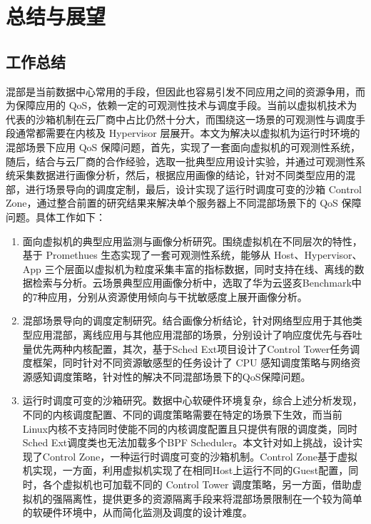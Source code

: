 \chapter{总结与展望}\label{chap:theories_tech}

\section{工作总结}

混部是当前数据中心常用的手段，但因此也容易引发不同应用之间的资源争用，而为保障应用的 QoS，依赖一定的可观测性技术与调度手段。当前以虚拟机技术为代表的沙箱机制在云厂商中占比仍然十分大，而围绕这一场景的可观测性与调度手段通常都需要在内核及 Hypervisor 层展开。本文为解决以虚拟机为运行时环境的混部场景下应用 QoS 保障问题，首先，实现了一套面向虚拟机的可观测性系统，随后，结合与云厂商的合作经验，选取一批典型应用设计实验，并通过可观测性系统采集数据进行画像分析，然后，根据应用画像的结论，针对不同类型应用的混部，进行场景导向的调度定制，最后，设计实现了运行时调度可变的沙箱 Control Zone，通过整合前置的研究结果来解决单个服务器上不同混部场景下的 QoS 保障问题。具体工作如下：

\begin{enumerate}
    \item 面向虚拟机的典型应用监测与画像分析研究。围绕虚拟机在不同层次的特性，基于 Promethues 生态实现了一套可观测性系统，能够从 Host、Hypervisor、App 三个层面以虚拟机为粒度采集丰富的指标数据，同时支持在线、离线的数据检索与分析。云场景典型应用画像分析中，选取了华为云竖亥Benchmark中的7种应用，分别从资源使用倾向与干扰敏感度上展开画像分析。

    \item 混部场景导向的调度定制研究。结合画像分析结论，针对网络型应用于其他类型应用混部，离线应用与其他应用混部的场景，分别设计了响应度优先与吞吐量优先两种内核配置，其次，基于Sched Ext项目设计了Control Tower任务调度框架，同时针对不同资源敏感型的任务设计了 CPU 感知调度策略与网络资源感知调度策略，针对性的解决不同混部场景下的QoS保障问题。

    \item 运行时调度可变的沙箱研究。数据中心软硬件环境复杂，综合上述分析发现，不同的内核调度配置、不同的调度策略需要在特定的场景下生效，而当前Linux内核不支持同时使能不同的内核调度配置且只提供有限的调度类，同时Sched Ext调度类也无法加载多个BPF Scheduler。本文针对如上挑战，设计实现了Control Zone，一种运行时调度可变的沙箱机制。Control Zone基于虚拟机实现，一方面，利用虚拟机实现了在相同Host上运行不同的Guest配置，同时，各个虚拟机也可加载不同的 Control Tower 调度策略，另一方面，借助虚拟机的强隔离性，提供更多的资源隔离手段来将混部场景限制在一个较为简单的软硬件环境中，从而简化监测及调度的设计难度。
\end{enumerate}

